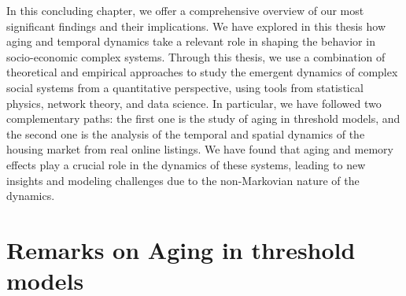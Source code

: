In this concluding chapter, we offer a comprehensive overview of our most significant findings and their implications. We have explored in this thesis how aging and temporal dynamics take a relevant role in shaping the behavior in socio-economic complex systems. Through this thesis, we use a combination of theoretical and empirical approaches to study the emergent dynamics of complex social systems from a quantitative perspective, using tools from statistical physics, network theory, and data science. In particular, we have followed two complementary paths: the first one is the study of aging in threshold models, and the second one is the analysis of the temporal and spatial dynamics of the housing market from real online listings. We have found that aging and memory effects play a crucial role in the dynamics of these systems, leading to new insights and modeling challenges due to the non-Markovian nature of the dynamics.

\section{Remarks on Aging in threshold models \label{sec:aging_threshold_models}}

